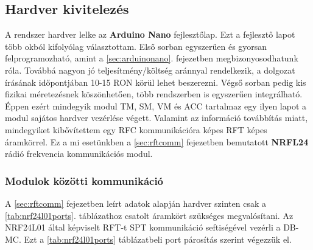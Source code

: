 \documentclass[a4paper,12pt]{article}
\begin{document}
\subsection{Hardver kivitelezés}
A rendszer hardver lelke az \textbf{Arduino Nano} fejlesztőlap. Ezt a fejlesztő lapot több okból kifolyólag választottam.
Első sorban egyszerűen és gyorsan felprogramozható, amint a \ref{sec:arduinonano}. fejezetben megbizonyosodhatunk róla.
Továbbá nagyon jó teljesítmény/költség aránnyal rendelkezik, a dolgozat írásának időpontjában 10-15 RON körül lehet beszerezni.
Végső sorban pedig kis fizikai méretezésnek köszönhetően, több rendszerben is egyszerűen integrálható. Éppen ezért mindegyik modul TM, SM, VM és ACC tartalmaz egy ilyen lapot a modul sajátos hardver vezérlése végett.
Valamint az információ továbbítás miatt, mindegyiket kibővítettem egy RFC kommunikációra képes RFT képes áramkörrel.
Ez a mi esetünkben a \ref{sec:rftcomm} fejezetben bemutatott \textbf{NRFL24} rádió frekvencia kommunikációs modul.
\subsubsection{Modulok közötti kommunikáció}\label{sec:RFTandRFC}
A \ref{sec:rftcomm} fejezetben leírt adatok alapján hardver szinten csak a \ref{tab:nrf24l01ports}. táblázathoz csatolt áramkört szükséges megvalósítani.
Az NRF24L01 által képviselt RFT-t SPT kommunikáció seftiségével vezérli a DB-MC.
Ezt a \ref{tab:nrf24l01ports} táblázatbeli port párosítás szerint végezzük el.
\end{document}
